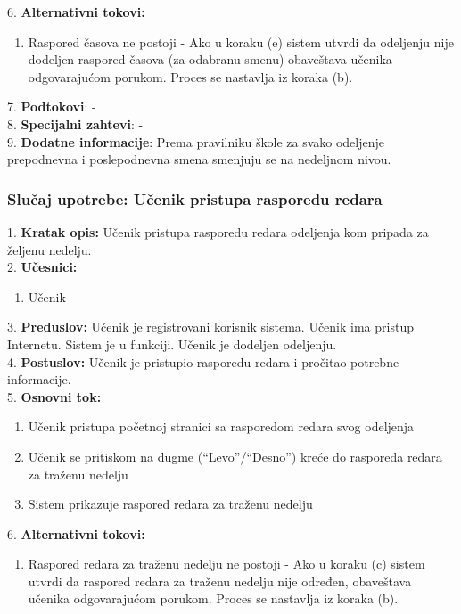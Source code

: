 \documentclass{article}
\begin{document}
6. \textbf{Alternativni tokovi:}
\begin{enumerate} [label=(\roman*)]
\item Raspored časova ne postoji - Ako u koraku (e) sistem utvrdi da odeljenju nije dodeljen raspored časova (za odabranu smenu) obaveštava učenika odgovarajućom porukom. Proces se nastavlja iz koraka (b).

\end{enumerate}

7. \textbf{Podtokovi}: - \\

8. \textbf{Specijalni zahtevi}: - \\

9. \textbf{Dodatne informacije}: Prema pravilniku škole za svako odeljenje prepodnevna i poslepodnevna smena smenjuju se na nedeljnom nivou. \\


\subsubsection{Slučaj upotrebe: Učenik pristupa rasporedu redara} 
1. \textbf{Kratak opis:} Učenik pristupa rasporedu redara odeljenja kom pripada za željenu nedelju. \\ 

2. \textbf{Učesnici:}
\begin{enumerate} [label=(\alph*)]
\item Učenik
\end{enumerate} 

3. \textbf{Preduslov:} Učenik je registrovani korisnik sistema. Učenik ima pristup Internetu. Sistem je u funkciji. Učenik je dodeljen odeljenju. \\

4. \textbf{Postuslov:} Učenik je pristupio rasporedu redara i pročitao potrebne informacije. \\

5. \textbf{Osnovni tok:} 
\begin{enumerate} [label=(\alph*)]
\item Učenik pristupa početnoj stranici sa rasporedom redara svog odeljenja
\item Učenik se pritiskom na dugme (``Levo''/``Desno'') kreće do rasporeda redara za traženu nedelju
\item Sistem prikazuje raspored redara za traženu nedelju
\end{enumerate}


6. \textbf{Alternativni tokovi:}
\begin{enumerate} [label=(\roman*)]
\item Raspored redara za traženu nedelju ne postoji - Ako u koraku (c) sistem utvrdi da raspored redara za traženu nedelju nije određen, obaveštava učenika odgovarajućom porukom. Proces se nastavlja iz koraka (b).
\end{enumerate}
\end{document}
